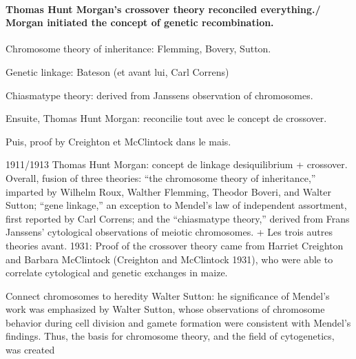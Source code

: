 




\paragraph{Thomas Hunt Morgan's crossover theory reconciled everything./ Morgan initiated the concept of genetic recombination.}




Chromosome theory of inheritance: Flemming, Bovery, Sutton.

Genetic linkage: Bateson (et avant lui, Carl Correns)

Chiasmatype theory: derived from Janssens observation of chromosomes. 

Ensuite, Thomas Hunt Morgan: reconcilie tout avec le concept de crossover. 

Puis, proof by Creighton et McClintock dans le mais. 




1911/1913 Thomas Hunt Morgan: concept de linkage desiquilibrium + crossover. Overall, fusion of three theories: “the chromosome theory of inheritance,” imparted by Wilhelm Roux, Walther Flemming, Theodor Boveri, and Walter Sutton; “gene linkage,” an exception to Mendel’s law of independent assortment, first reported by Carl Correns; and the “chiasmatype theory,” derived from Frans Janssens' cytological observations of meiotic chromosomes.
+ Les trois autres theories avant.
1931: Proof of the crossover theory came from Harriet Creighton and Barbara McClintock (Creighton and McClintock 1931), who were able to correlate cytological and genetic exchanges in maize.








Connect chromosomes to heredity
Walter Sutton: he significance of Mendel's work was emphasized by Walter Sutton, whose observations of chromosome behavior during cell division and gamete formation were consistent with Mendel's findings. Thus, the basis for chromosome theory, and the field of cytogenetics, was created

